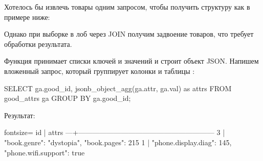 Хотелось бы извлечь товары одним запросом, чтобы получить структуру как в примере ниже:

\begin{english}
  \begin{clojure}
  \end{clojure}
\end{english}

Однако при выборке в лоб через JOIN получим задвоение товаров, что требует обработки результата.

Функция  принимает списки ключей и значений и строит объект JSON. Напишем вложенный запрос, который группирует колонки  и  таблицы :

\begin{english}
  \begin{clojure}
SELECT
  ga.good_id,
  jsonb_object_agg(ga.attr, ga.val) as attrs
FROM good_attrs ga
  GROUP BY ga.good_id;
  \end{clojure}
\end{english}

Результат:


\begin{english}
  \begin{text*}{fontsize=\small}
id |                          attrs
---+---------------------------------------------------------
 3 | {"book.genre": "dystopia", "book.pages": 215}
 1 | {"phone.display.diag": 145, "phone.wifi.support": true}
  \end{text*}
\end{english}

